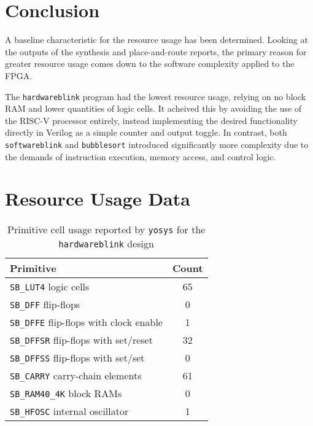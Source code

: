 \documentclass[a4paper,10pt]{article}
\begin{document}
\section{Conclusion}
\label{sec:Conclusion}

A baseline characteristic for the resource usage has been determined.
Looking at the outputs of the synthesis and place-and-route reports,
the primary reason for greater resource usage comes down to
the software complexity applied to the FPGA.

The \texttt{hardwareblink} program had the lowest resource usage,
relying on no block RAM and lower quantities of logic cells.
It acheived this by avoiding the use of the RISC-V processor entirely, 
instead implementing the desired functionality directly in Verilog 
as a simple counter and output toggle. 
In contrast, both \texttt{softwareblink} and \texttt{bubblesort} 
introduced significantly more complexity due to 
the demands of instruction execution, 
memory access, and control logic. 

\newpage
\appendix
\label{Appendix}
\section{Resource Usage Data}

\begin{table}[H]
    \centering
    \begin{tabular}{|l|c|}
        \hline
        \textbf{Primitive} & \textbf{Count} \\
        \hline
        \texttt{SB\_LUT4} logic cells & 65 \\
        \texttt{SB\_DFF} flip-flops & 0 \\
        \texttt{SB\_DFFE} flip-flops with clock enable & 1 \\
        \texttt{SB\_DFFSR} flip-flops with set/reset & 32 \\
        \texttt{SB\_DFFSS} flip-flops with set/set & 0 \\
        \texttt{SB\_CARRY} carry-chain elements & 61 \\
        \texttt{SB\_RAM40\_4K} block RAMs & 0 \\
        \texttt{SB\_HFOSC} internal oscillator & 1 \\
        \hline
    \end{tabular}
    \caption{Primitive cell usage reported by 
    \texttt{yosys} for the \texttt{hardwareblink} design}
    \label{tab:hardware_yosys_report}
\end{table}
\end{document}
